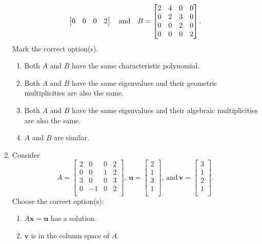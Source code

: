 \documentclass[12pt]{article}
\begin{document}
\begin{enumerate}[leftmargin=*]
\begin{equation*}
\begin{bmatrix}
	 		0 & 0 & 0 & 2 \\
	 	\end{bmatrix}
	 	\quad\text{and}\quad
	 	B = \begin{bmatrix}
	 		2 & 4 & 0 & 0 \\
	 		0 & 2 & 3 & 0 \\
	 		0 & 0 & 2 & 0 \\
	 		0 & 0 & 0 & 2 \\
	 	\end{bmatrix}.
	 \end{equation*}
	 Mark the correct option(s).
	 \begin{enumerate}
	 	\item Both $A$ and $B$ have the same characteristic polynomial.
	 	\item Both $A$ and $B$ have the same eigenvalues and their geometric multiplicities are also the same.
	 	\item Both $A$ and $B$ have the same eigenvalues and their algebraic multiplicities are also the same.
	 	\item $A$ and $B$ are similar.
	 \end{enumerate}
	 \item Consider
	 \begin{equation*} 
	 	A = 
	 	\begin{bmatrix}
	 		2 & 0 & 0 & 2 \\
	 		0 & 0 & 1 & 2 \\
	 		3 & 0 & 0 & 3 \\
	 		0 & -1 & 0 & 2 \\
	 	\end{bmatrix},
	 	\, 
	 	\mathbf{u} = 
	 	\begin{bmatrix}
	 		2 \\
	 		1 \\
	 		3 \\
	 		1 \\
	 	\end{bmatrix}, 
	 	\, \text{and} \, 
	 	\mathbf{v} = 
	 	\begin{bmatrix}
	 		3 \\
	 		1 \\
	 		2 \\
	 		1 \\
	 	\end{bmatrix}.
	 \end{equation*}
	 Choose the correct option(s):
	 \begin{enumerate}
	 	\item $A \mathbf{x} = \mathbf{u}$ has a solution.
	 	\item $\mathbf{v}$ is in the column space of $A$.

\end{enumerate}
\end{enumerate}
\end{document}
